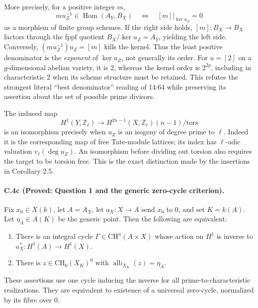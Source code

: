 More precisely, for a positive integer $m$,
\begin{equation}\label{eq:denominator-exponent}
 m u_Z^{-1}\in\operatorname{Hom}(A_Y,B_X)
 \quad\Longleftrightarrow\quad [m]|_{\ker u_Z}=0
\end{equation}
as a morphism of finite group schemes. If the right side holds,
$[m]:B_X\to B_X$ factors through the fppf quotient
$B_X/\ker u_Z=A_Y$, yielding the left side. Conversely,
$(m u_Z^{-1})u_Z=[m]$ kills the kernel. Thus the least positive
denominator is the \emph{exponent} of $\ker u_Z$, not generally its
order. For $u=[2]$ on a $g$-dimensional abelian variety, it is $2$,
whereas the kernel order is $2^{2g}$, including in characteristic $2$
when its scheme structure must be retained. This refutes the strongest
literal ``best denominator'' reading of 14:64 while preserving its
assertion about the set of possible prime divisors.

The induced map
\[
 H^1(Y,\mathbb Z_\ell)\longrightarrow
 H^{2n-1}(X,\mathbb Z_\ell)(n-1)/\mathrm{tors}
\]
is an isomorphism precisely when $u_Z$ is an isogeny of degree prime
to $\ell$. Indeed it is the corresponding map of free Tate-module
lattices; its index has $\ell$-adic valuation
$v_\ell(\deg u_Z)$. An isomorphism before dividing out torsion also
requires the target to be torsion free. This is the exact distinction
made by the insertions in Corollary 2.5.

\paragraph{C.4c (Proved: Question 1 and the generic zero-cycle criterion).}
Fix $x_0\in X(k)$, let $A=A_X$, let $a_X:X\to A$ send $x_0$ to $0$,
and set $K=k(A)$. Let $\eta_A\in A(K)$ be the generic point. Then the
following are equivalent:
\begin{enumerate}
\item There is an integral cycle $\Gamma\in\mathrm{CH}^{n}(A\times X)$
whose action on $H^1$ is inverse to $a_X^*:H^1(A)\to H^1(X)$.
\item There is $z\in\mathrm{CH}_0(X_K)^0$ with
$\operatorname{alb}_{X_K}(z)=\eta_A$.
\end{enumerate}
These assertions use one cycle inducing the inverse for all
prime-to-characteristic realizations. They are equivalent to existence
of a universal zero-cycle, normalized by its fibre over $0$.

